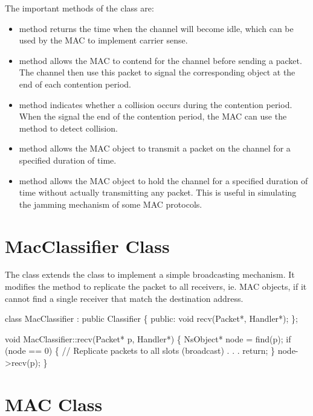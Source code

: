 The important methods of the class  are:

\begin{itemize}
\item  {} method returns the time when the channel will become
idle, which can be used by the MAC to implement carrier sense.
\item  {} method allows the MAC to contend for the channel
before sending a packet.  The channel then use this packet to signal the
corresponding  object at the end of each contention period.
\item  {} method indicates whether a collision occurs
during the contention period.  When the  signal the end of
the contention period, the MAC can use the  method to
detect collision.
\item  {} method allows the MAC object to transmit a packet on the
channel for a specified duration of time.
\item  {} method allows the MAC object to hold the channel for a
specified duration of time without actually transmitting any packet.
This is useful in simulating the jamming mechanism of some MAC
protocols.
\end{itemize}

\section{MacClassifier Class}
\label{sec:mac_classifier}

The  class extends the  class to
implement a simple broadcasting mechanism.  It modifies the
 method to replicate the packet to all receivers, ie. MAC
objects, if it cannot find a single receiver that match the destination
address.

\begin{program}
    class MacClassifier : public Classifier \{
    public:
        void recv(Packet*, Handler*);
    \};

    void MacClassifier::recv(Packet* p, Handler*)
    \{
        NsObject* node = find(p);
        if (node == 0) \{
                // Replicate packets to all slots (broadcast)
                . . .
                return;
        \}
        node->recv(p);
    \}
\end{program}


\section{MAC Class}
\label{sec:mac}

